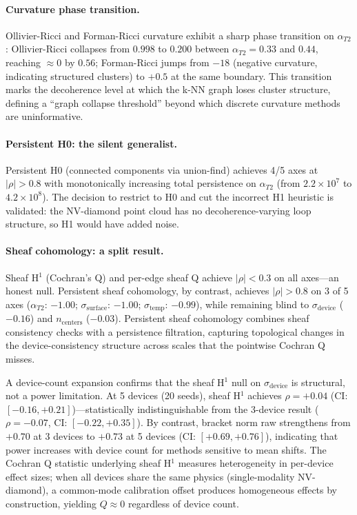 \documentclass[11pt]{article}
\begin{document}
\paragraph{Curvature phase transition.}
Ollivier-Ricci and Forman-Ricci curvature exhibit a sharp phase
transition on $\alpha_{T2}$: Ollivier-Ricci collapses from $0.998$ to
$0.200$ between $\alpha_{T2} = 0.33$ and $0.44$, reaching $\approx 0$
by $0.56$; Forman-Ricci jumps from $-18$ (negative curvature,
indicating structured clusters) to $+0.5$ at the same boundary.  This
transition marks the decoherence level at which the k-NN graph loses
cluster structure, defining a ``graph collapse threshold'' beyond which
discrete curvature methods are uninformative.

\paragraph{Persistent H0: the silent generalist.}
Persistent H0 (connected components via union-find) achieves 4/5 axes
at $|\rho| > 0.8$ with monotonically increasing total persistence on
$\alpha_{T2}$ (from $2.2 \times 10^7$ to $4.2 \times 10^8$).  The
decision to restrict to H0 and cut the incorrect H1 heuristic is
validated: the NV-diamond point cloud has no decoherence-varying loop
structure, so H1 would have added noise.

\paragraph{Sheaf cohomology: a split result.}
Sheaf H$^1$ (Cochran's Q) and per-edge sheaf Q achieve $|\rho| < 0.3$
on all axes---an honest null.  Persistent sheaf cohomology, by contrast, achieves
$|\rho| > 0.8$ on 3 of 5 axes ($\alpha_{T2}$: $-1.00$;
$\sigma_\text{surface}$: $-1.00$; $\sigma_\text{temp}$: $-0.99$),
while remaining blind to $\sigma_\text{device}$ ($-0.16$) and
$n_\text{centers}$ ($-0.03$).  Persistent sheaf cohomology combines
sheaf consistency checks with a persistence filtration, capturing
topological changes in the device-consistency structure across scales
that the pointwise Cochran Q misses.

A device-count expansion confirms that the sheaf H$^1$ null on
$\sigma_\text{device}$ is structural, not a power limitation.
At 5 devices (20 seeds), sheaf H$^1$ achieves $\rho = +0.04$
(CI: $[-0.16, +0.21]$)---statistically indistinguishable from the
3-device result ($\rho = -0.07$, CI: $[-0.22, +0.35]$).  By
contrast, bracket norm raw strengthens from $+0.70$ at 3 devices
to $+0.73$ at 5 devices (CI: $[+0.69, +0.76]$), indicating that
power increases with device count for methods sensitive to mean
shifts.  The Cochran Q statistic underlying sheaf H$^1$ measures
heterogeneity in per-device effect sizes; when all devices share
the same physics (single-modality NV-diamond), a common-mode
calibration offset produces homogeneous effects by construction,
yielding $Q \approx 0$ regardless of device count.
\end{document}
